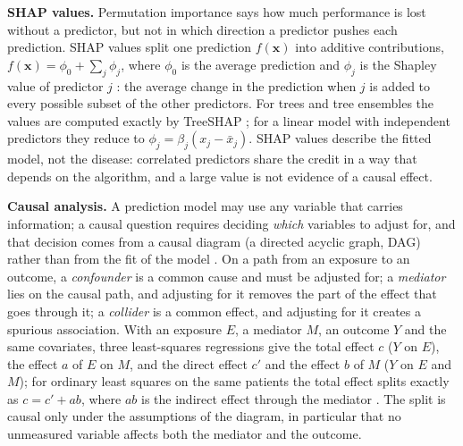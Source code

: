 \textbf{SHAP values.} Permutation importance says how much performance is lost without a predictor,
but not in which direction a predictor pushes each prediction. SHAP values \cite{lundberg2017} split one
prediction $f(\mathbf x)$ into additive contributions, $f(\mathbf x) = \phi_0 + \sum_j \phi_j$, where
$\phi_0$ is the average prediction and $\phi_j$ is the Shapley value of predictor $j$
\cite{shapley1953}: the average change in the prediction when $j$ is added to every possible subset of
the other predictors. For trees and tree ensembles the values are computed exactly by TreeSHAP
\cite{lundberg2020}; for a linear model with independent predictors they reduce to
$\phi_j = \beta_j(x_j - \bar x_j)$. SHAP values describe the fitted model, not the disease: correlated
predictors share the credit in a way that depends on the algorithm, and a large value is not evidence of
a causal effect.

\textbf{Causal analysis.} A prediction model may use any variable that carries information; a causal
question requires deciding \emph{which} variables to adjust for, and that decision comes from a causal
diagram (a directed acyclic graph, DAG) rather than from the fit of the model
\cite{pearl2009,huntingtonklein2021}. On a path from an exposure to an outcome, a \emph{confounder} is a
common cause and must be adjusted for; a \emph{mediator} lies on the causal path, and adjusting for it
removes the part of the effect that goes through it; a \emph{collider} is a common effect, and adjusting
for it creates a spurious association. With an exposure $E$, a mediator $M$, an outcome $Y$ and the same
covariates, three least-squares regressions give the total effect $c$ ($Y$ on $E$), the effect $a$ of
$E$ on $M$, and the direct effect $c'$ and the effect $b$ of $M$ ($Y$ on $E$ and $M$); for ordinary
least squares on the same patients the total effect splits exactly as $c = c' + ab$, where $ab$ is the
indirect effect through the mediator \cite{baron1986,mackinnon1995}. The split is causal only under the
assumptions of the diagram, in particular that no unmeasured variable affects both the mediator and the
outcome.
